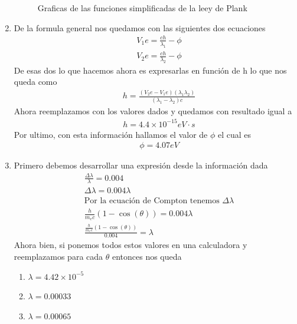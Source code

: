 \documentclass[12pt]{exam}
\begin{document}
\begin{enumerate}
\begin{figure}[h]
			\caption{Graficas de las funciones simplificadas de la leey de Plank}
		\end{figure}
	\item De la formula general nos quedamos con las siguientes dos ecuaciones
		\begin{align*}
			&V_1e=\frac{ch}{\lambda_1}-\phi\\
			&V_2e=\frac{ch}{\lambda_2}-\phi
		\end{align*}
		De esas dos lo que hacemos ahora es expresarlas en función de h lo que nos queda como 
		\begin{align*}
			&h = \frac{(V_2e-V_1e)(\lambda_1\lambda_2)}{(\lambda_1 - \lambda_2)c}
		\end{align*}
		Ahora reemplazamos con los valores dados y quedamos con resultado igual a
		\begin{align*}
			&h = 4.4\times 10^{-15}eV\cdot s
		\end{align*}
		Por ultimo, con esta información hallamos el valor de $\phi$ el cual es
		\begin{align*}
			&\phi = 4.07 eV
		\end{align*}
	\item Primero debemos desarrollar una expresión desde la información dada
		\begin{align*}
			& \frac{\Delta \lambda}{\lambda} = 0.004\\
			& \Delta \lambda = 0.004 \lambda\\
			& \text{Por la ecuación de Compton tenemos }\Delta \lambda\\
			& \frac{h}{m_e c}(1-\cos(\theta))=0.004\lambda\\
			& \frac{\frac{h}{m_e c}(1-\cos(\theta))}{0.004}=\lambda
		\end{align*}
		Ahora bien, si ponemos todos estos valores en una calculadora y reemplazamos para cada $\theta$ entonces nos queda
		\begin{enumerate}
			\item $\lambda = 4.42\times 10^{-5}$
			\item $\lambda = 0.00033$
			\item $\lambda = 0.00065$
		\end{enumerate}
\end{enumerate}
\end{document}
